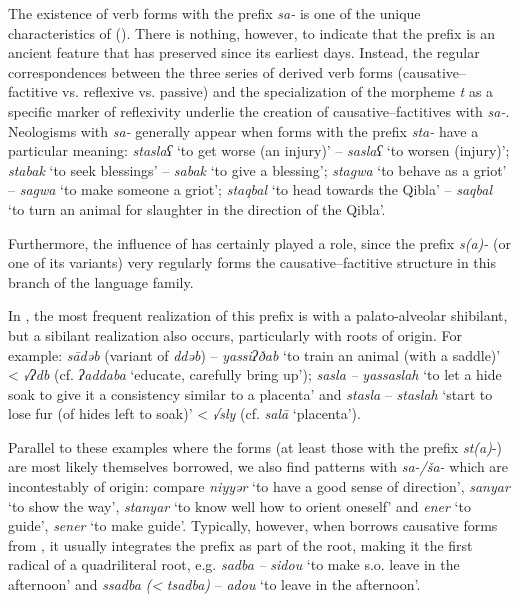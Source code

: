 \documentclass[output=paper]{langsci/langscibook}
\begin{document}
The existence of verb forms with the prefix \textit{sa-} is one of the unique characteristics of  (\citealt{Cohen1963,Taine-Cheikh2003}). There is nothing, however, to indicate that the prefix is an ancient  feature that  has preserved since its earliest days. Instead, the regular correspondences between the three series of derived verb forms (causative--factitive vs. reflexive vs. {passive}) and the specialization of the morpheme \textit{t} as a specific marker of reflexivity underlie the creation of causative--factitives with \textit{sa-}. Neologisms with \textit{sa-} generally appear when forms with the prefix \textit{sta-} have a particular meaning: \textit{staslaʕ} ‘to get worse (an injury)’ – \textit{saslaʕ} ‘to worsen (injury)’; \textit{stab{\R}ak} ‘to seek blessings’ – \textit{sab{\R}ak} ‘to give a blessing’; \textit{stagwa} ‘to behave as a griot’ – \textit{sagwa} ‘to make someone a griot’; \textit{staqbal} ‘to head towards the Qibla’ – \textit{saqbal} ‘to turn an animal for slaughter in the direction of the Qibla’. 

Furthermore, the influence of  has certainly played a role, since the prefix \textit{s(a)-} (or one of its variants) very regularly forms the causative--factitive structure in this branch of the  language family. 

In , the most frequent realization of this prefix is with a palato-alveolar shibilant, but a {sibilant} realization also occurs, particularly with {roots} of  origin. For example:  \textit{sādəb} (variant of \textit{ddəb}) –  \textit{yassiʔðab} ‘to train an animal (with a saddle)’ <  \textit{√ʔdb} (cf. \textit{ʔaddaba} ‘educate, carefully bring up’);  \textit{sasla} \textit{–}  \textit{yassaslah} ‘to let a hide soak to give it a consistency similar to a placenta’ and  \textit{stasla} –  \textit{staslah} ‘start to lose fur (of hides left to soak)’ <  \textit{√sly} (cf. \textit{salā} ‘placenta’).

Parallel to these examples where the  forms (at least those with the prefix \textit{st(a)}{}-) are most likely themselves borrowed, we also find patterns with \textit{sa-/ša-} which are incontestably of  origin: compare  \textit{niyyər} ‘to have a good sense of direction’, \textit{sanyar} ‘to show the way’, \textit{stanyar} ‘to know well how to orient oneself’ and  \textit{ener} ‘to guide’, \textit{sener} ‘to make guide’. Typically, however, when  borrows {causative} forms from , it usually integrates the  prefix as part of the  {root}, making it the first radical of a quadriliteral {root}, e.g.  \textit{sadba} \textit{–}  \textit{sidou} ‘to make s.o. leave in the afternoon’ and  \textit{ssadba} \textit{(<} \textit{tsadba)} –  \textit{adou} ‘to leave in the afternoon’. 
\end{document}
